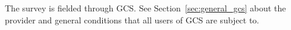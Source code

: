 The survey is fielded through \ac{GCS}. See Section~\ref{sec:general_gcs} about the provider and general conditions that all users of \ac{GCS} are subject to.